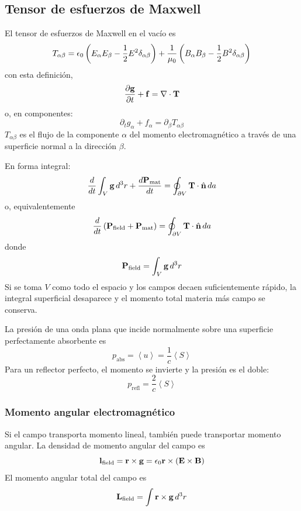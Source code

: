 \documentclass[]{article}
\numberwithin{equation}{section}
\begin{document}
\subsection{Tensor de esfuerzos de Maxwell}
El tensor de esfuerzos de Maxwell en el vacío es
\begin{equation}
	T_{\alpha\beta} = \epsilon_{0}\left(E_{\alpha} E_{\beta} - \frac{1}{2}E^2 \delta_{\alpha\beta}\right) + \frac{1}{\mu_{0}} \left(B_{\alpha}B_{\beta} - \frac{1}{2}B^2\delta_{\alpha\beta} \right)
\end{equation}
con esta definición,
\begin{equation}
	\dfrac{\partial \mathbf{g}}{\partial t} + \mathbf{f} = \nabla\cdot\mathbf{T}
\end{equation}
o, en componentes:
\begin{equation}
	\partial_{t} g_{\alpha} + f_{\alpha} = \partial_{\beta} T_{\alpha\beta}
\end{equation}
\(T_{\alpha\beta}\) es el flujo de la componente $\alpha$ del momento electromagnético a través de una superficie normal a la dirección $\beta$.

En forma integral:
\begin{equation*}
	\dfrac{d }{d t} \int_{V}\mathbf{g}\, d^3 r + \dfrac{d \mathbf{P}_{\mathrm{mat}}}{d t} = \oint_{\partial V}\mathbf{T}\cdot\hat{\mathbf{n}}\, da
\end{equation*}
o, equivalentemente
\begin{equation}
	\dfrac{d }{d t} \left(\mathbf{P}_{\mathrm{field}} + \mathbf{P}_{\mathrm{mat}}\right) = \oint_{\partial V}\mathbf{T}\cdot\hat{\mathbf{n}}\, da
\end{equation}
donde
\begin{equation*}
	\mathbf{P}_{\mathrm{field}} = \int_{V}\mathbf{g}\, d^3 r
\end{equation*}
Si se toma \(V\) como todo el espacio y los campos decaen suficientemente rápido, la integral superficial desaparece y el momento total materia más campo se conserva.

La presión de una onda plana que incide normalmente sobre una superficie perfectamente absorbente es
\begin{equation}
	p_{\mathrm{abs}} = \left< u \right> = \frac{1}{c} \left< S \right>
\end{equation}
Para un reflector perfecto, el momento se invierte y la presión es el doble:
\begin{equation}
	p_{\mathrm{refl}} = \frac{2}{c} \left< S \right>
\end{equation}

\subsubsection{Momento angular electromagnético}
Si el campo transporta momento lineal, también puede transportar momento angular. La densidad de momento angular del campo es
\begin{equation}
	\mathbf{l}_{\mathrm{field}} = \mathbf{r}\times\mathbf{g} = \epsilon_{0}\mathbf{r}\times\left(\mathbf{E}\times\mathbf{B}\right)
\end{equation}
El momento angular total del campo es
\begin{equation}
	\mathbf{L}_{\mathrm{field}} = \int \mathbf{r}\times\mathbf{g} \, d^3 r
\end{equation}
\end{document}
